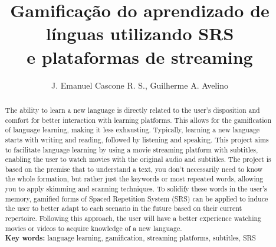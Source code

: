 \documentclass[12pt]{article}
\title{Gamificação do aprendizado de línguas utilizando SRS\\e plataformas de streaming}
\author{J. Emanuel Cascone R. S.\inst{1}, Guilherme A. Avelino\inst{1} }
\begin{document}
 

\maketitle

\begin{abstract}
  The ability to learn a new language is directly related to the user's disposition and comfort for better interaction with learning platforms. This allows for the gamification of language learning, making it less exhausting. Typically, learning a new language starts with writing and reading, followed by listening and speaking. This project aims to facilitate language learning by using a movie streaming platform with subtitles, enabling the user to watch movies with the original audio and subtitles. The project is based on the premise that to understand a text, you don't necessarily need to know the whole formation, but rather just the keywords or most repeated words, allowing you to apply skimming and scanning techniques. To solidify these words in the user's memory, gamified forms of Spaced Repetition System (SRS) can be applied to induce the user to better adapt to each scenario in the future based on their current repertoire. Following this approach, the user will have a better experience watching movies or videos to acquire knowledge of a new language. \\
\textbf{Key words:} language learning, gamification, streaming platforms, subtitles, SRS 
\end{abstract}
     
\end{document}
